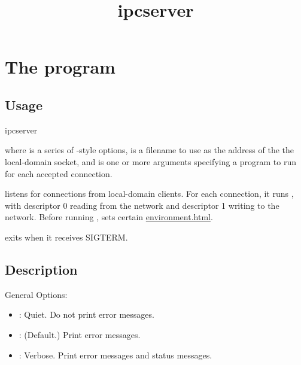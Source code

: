 \documentclass{book}
\title{ipcserver}
\begin{document}
\section{The  program}

\subsection{Usage}
\begin{code}%
  ipcserver   
\end{code}
where  is a series of -style options,
 is a filename to use as the address of the the
local-domain socket, and  is one or more arguments
specifying a program to run for each accepted connection.

 listens for connections from local-domain clients.
For each connection, it runs , with descriptor 0 reading
from the network and descriptor 1 writing to the network.  Before
running ,  sets certain
\href{environment variables}{environment.html}.

 exits when it receives SIGTERM.

\subsection{Description}
General Options:
\begin{itemize}
\item {}: Quiet.  Do not print error messages.
\item {}: (Default.)  Print error messages.
\item {}: Verbose.  Print error messages and status messages.
\end{itemize}
\end{document}
